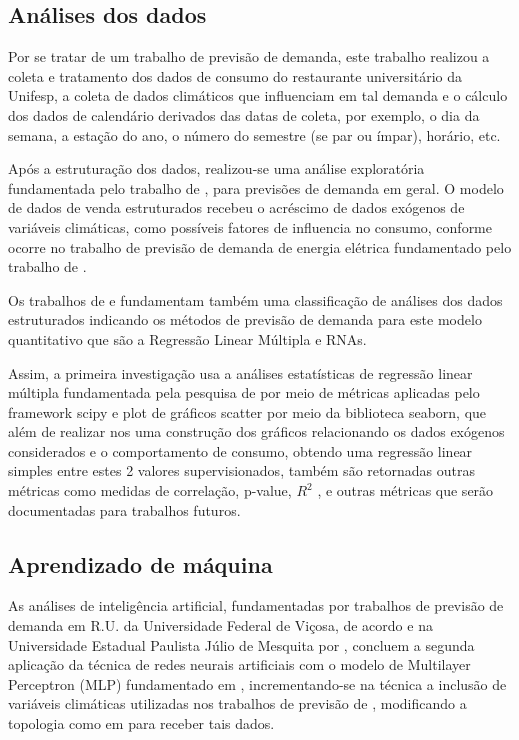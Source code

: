 \documentclass[	12pt, Times, openright, twoside, a4paper, english, brazil]{abntex2}
\begin{document}
        \subsection{Análises dos dados}

          Por se tratar de um trabalho de previsão de demanda,  este trabalho realizou a coleta e tratamento dos dados de consumo do restaurante universitário da Unifesp, a coleta de dados climáticos que influenciam em tal demanda e o cálculo dos dados de calendário derivados das datas de coleta, por exemplo, o dia da semana, a estação do ano, o número do semestre (se par ou ímpar), horário, etc.

          Após a estruturação dos dados, realizou-se uma análise exploratória fundamentada pelo trabalho de \cite{Junior2007}, para previsões de demanda em geral.
          O modelo de dados de venda estruturados recebeu o acréscimo de dados exógenos de variáveis climáticas, como possíveis fatores de influencia no consumo, conforme ocorre no trabalho de previsão de demanda de energia elétrica fundamentado pelo trabalho de \cite{Almeida2013,RUAS2012,Silva2010}.

          Os trabalhos de \cite{Junior2007} e \cite{Silva2010} fundamentam também uma classificação de análises dos dados estruturados indicando os métodos de previsão de demanda para este modelo quantitativo que são a Regressão Linear Múltipla e RNAs.

          Assim, a primeira investigação usa a análises estatísticas de regressão linear múltipla fundamentada pela pesquisa de \cite{Clarice2011} por meio de métricas aplicadas pelo framework scipy e plot de gráficos scatter por meio da biblioteca seaborn, que além de realizar nos uma construção dos gráficos relacionando os dados exógenos considerados e o comportamento de consumo, obtendo uma regressão linear simples entre estes 2 valores supervisionados, também são retornadas outras métricas como medidas de correlação, p-value, $R^2$ , e outras métricas que serão documentadas para trabalhos futuros.

        \subsection{Aprendizado de máquina}
          As análises de inteligência artificial, fundamentadas por trabalhos de previsão de demanda em R.U. da Universidade Federal de Viçosa, de acordo \cite{Lopes2008} e na Universidade Estadual Paulista Júlio de Mesquita por \cite{Rocha2011}, concluem a segunda aplicação da técnica de redes neurais artificiais com o modelo de Multilayer Perceptron (MLP) fundamentado em \cite{Haykin1994}, incrementando-se na técnica a inclusão de variáveis climáticas utilizadas nos trabalhos de previsão de  \cite{Almeida2013, RUAS2012, Silva2010}, modificando a topologia como em \cite{Lopes2008} para receber tais dados.
          
\end{document}
